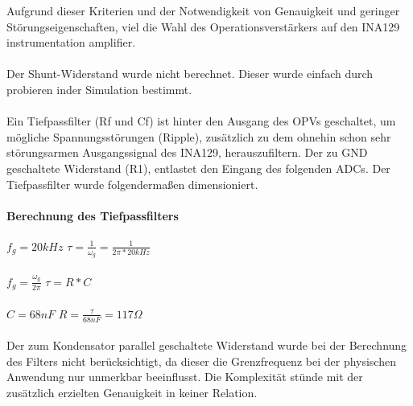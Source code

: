 \documentclass[titlepage,12pt,twoside]{article}
\begin{document}
Aufgrund dieser Kriterien und der Notwendigkeit von Genauigkeit und geringer Störungseigenschaften, viel die Wahl des 
Operationsverstärkers auf den INA129 instrumentation amplifier. \\
\\
Der Shunt-Widerstand wurde nicht berechnet. Dieser wurde einfach durch probieren inder Simulation bestimmt. \\
\\
Ein Tiefpassfilter (Rf und Cf) ist hinter den Ausgang des OPVs geschaltet, um mögliche Spannungsstörungen (Ripple), zusätzlich
zu dem ohnehin schon sehr störungsarmen Ausgangssignal des INA129, herauszufiltern. Der zu GND geschaltete Widerstand (R1), 
entlastet den Eingang des folgenden ADCs. Der Tiefpassfilter wurde folgendermaßen dimensioniert. \\
\paragraph{Berechnung des Tiefpassfilters}
\hfill \break
\hfill \break
\hspace*{1cm} $f_{g} = 20 kHz $ \hspace*{1cm} $\tau = \frac{1}{\omega_{g}} = \frac{1}{2\pi * 20 kHz} $ \\
\\
\hspace*{1cm} $f_{g} = \frac{\omega_{g}}{2\pi} $ \hspace*{1.7cm} $\tau = R * C $ \\
\\
\hspace*{4.25cm} $ C = 68 nF $ \hspace*{1cm} $ R = \frac{\tau}{68nF} = 117 \Omega $ \\
\\
Der zum Kondensator parallel geschaltete Widerstand wurde bei der Berechnung des Filters nicht berücksichtigt,
da dieser die Grenzfrequenz bei der physischen Anwendung nur unmerkbar beeinflusst. Die Komplexität stünde mit der 
zusätzlich erzielten Genauigkeit in keiner Relation. \\
\end{document}
